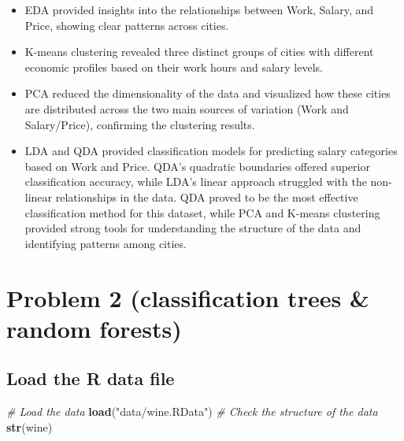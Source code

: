\documentclass[
]{article}
\newenvironment{Shaded}{\begin{snugshade}}{\end{snugshade}}
\newcommand{\CommentTok}[1]{\textcolor[rgb]{0.56,0.35,0.01}{\textit{#1}}}
\newcommand{\FunctionTok}[1]{\textcolor[rgb]{0.13,0.29,0.53}{\textbf{#1}}}
\newcommand{\NormalTok}[1]{#1}
\newcommand{\StringTok}[1]{\textcolor[rgb]{0.31,0.60,0.02}{#1}}
\providecommand{\tightlist}{%
  \setlength{\itemsep}{0pt}\setlength{\parskip}{0pt}}
\begin{document}
\begin{itemize}
\tightlist
\item
  EDA provided insights into the relationships between Work, Salary, and
  Price, showing clear patterns across cities.
\item
  K-means clustering revealed three distinct groups of cities with
  different economic profiles based on their work hours and salary
  levels.
\item
  PCA reduced the dimensionality of the data and visualized how these
  cities are distributed across the two main sources of variation (Work
  and Salary/Price), confirming the clustering results.
\item
  LDA and QDA provided classification models for predicting salary
  categories based on Work and Price. QDA's quadratic boundaries offered
  superior classification accuracy, while LDA's linear approach
  struggled with the non-linear relationships in the data. QDA proved to
  be the most effective classification method for this dataset, while
  PCA and K-means clustering provided strong tools for understanding the
  structure of the data and identifying patterns among cities.
\end{itemize}

\section{Problem 2 (classification trees \& random
forests)}\label{problem-2-classification-trees-random-forests}

\subsection{Load the R data file}\label{load-the-r-data-file}

\begin{Shaded}
\begin{Highlighting}[]
\CommentTok{\# Load the data}
\FunctionTok{load}\NormalTok{(}\StringTok{"data/wine.RData"}\NormalTok{)}
\CommentTok{\# Check the structure of the data}
\FunctionTok{str}\NormalTok{(wine)}
\end{Highlighting}
\end{Shaded}
\end{document}
